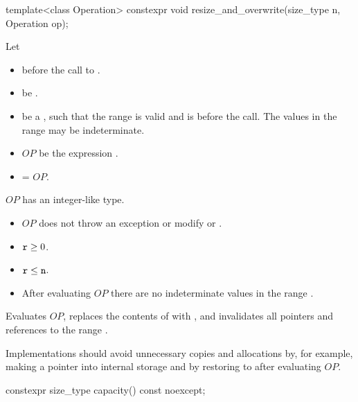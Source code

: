 %
\begin{itemdecl}
template<class Operation> constexpr void resize_and_overwrite(size_type n, Operation op);
\end{itemdecl}

\begin{itemdescr}
\pnum
Let
\begin{itemize}
\item
{} before the call to .
\item
{} be .
\item
{} be a ,
such that the range  is valid and
 is  before the call.
The values in the range  may be indeterminate.
\item
$OP$ be the expression .
\item
{} = $OP$.
\end{itemize}

\pnum
\mandates
$OP$ has an integer-like type.

\pnum
\expects
\begin{itemize}
\item
$OP$ does not throw an exception or modify  or .
\item
$\texttt{r} \geq 0$.
\item
$\texttt{r} \leq \texttt{n}$.
\item
After evaluating $OP$
there are no indeterminate values in the range .
\end{itemize}

\pnum
\effects
Evaluates $OP$,
replaces the contents of  with , and
invalidates all pointers and references to the range .

\pnum
\recommended
Implementations should avoid unnecessary copies and allocations
by, for example, making  a pointer into internal storage and
by restoring  to  after evaluating $OP$.
\end{itemdescr}

%
\begin{itemdecl}
constexpr size_type capacity() const noexcept;
\end{itemdecl}

